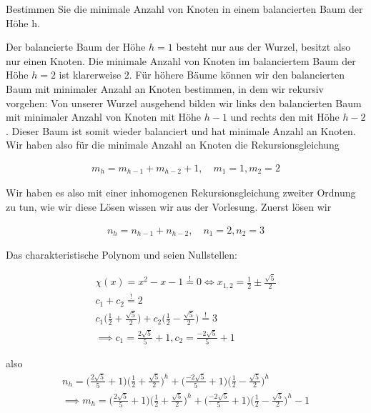 
\begin{exercise}

Bestimmen Sie die minimale Anzahl von Knoten in einem balancierten Baum der Höhe h.

\end{exercise}


\begin{solution}

Der balancierte Baum der Höhe $h = 1$ besteht nur aus der Wurzel, besitzt also nur einen Knoten. Die minimale Anzahl von Knoten im balanciertem Baum der Höhe $h = 2$ ist klarerweise $2$. Für höhere Bäume können wir den balancierten Baum mit minimaler Anzahl an Knoten bestimmen, in dem wir rekursiv vorgehen: Von unserer Wurzel ausgehend bilden wir links den balancierten Baum mit minimaler Anzahl von Knoten mit Höhe $h-1$ und rechts den mit Höhe $h-2$. Dieser Baum ist somit wieder balanciert und hat minimale Anzahl an Knoten. Wir haben also für die minimale Anzahl an Knoten die Rekursionsgleichung

\begin{align*}
  m_h = m_{h-1} + m_{h-2} + 1, \quad m_1 = 1, m_2 = 2
\end{align*}

Wir haben es also mit einer inhomogenen Rekursionsgleichung zweiter Ordnung zu tun, wie wir diese Lösen wissen wir aus der Vorlesung. Zuerst lösen wir

\begin{align*}
  n_h = n_{h-1} + n_{h-2}, \quad n_1 = 2, n_2 = 3
\end{align*}

Das charakteristische Polynom und seien Nullstellen:

\begin{align*}
  \chi(x) = x^2 - x - 1 \stackrel{!}{=} 0
  \iff
  x_{1,2} = \frac{1}{2} \pm \frac{\sqrt{5}}{2} \\
  c_1 + c_2 \stackrel{!}{=} 2 \\
  c_1\Big(\frac{1}{2} + \frac{\sqrt{5}}{2}\Big) + c_2 \Big(\frac{1}{2} - \frac{\sqrt{5}}{2}\Big) \stackrel{!}{=} 3 \\
  \implies c_1 = \frac{2\sqrt{5}}{5} + 1, c_2 = \frac{-2\sqrt{5}}{5} + 1
\end{align*}

also
\begin{align*}
  n_h = \Big(\frac{2\sqrt{5}}{5} + 1\Big)\Big(\frac{1}{2} + \frac{\sqrt{5}}{2}\Big)^h + \Big(\frac{-2\sqrt{5}}{5} + 1 \Big)\Big(\frac{1}{2} - \frac{\sqrt{5}}{2}\Big)^h \\
  \implies
  m_h = \Big(\frac{2\sqrt{5}}{5} + 1\Big)\Big(\frac{1}{2} + \frac{\sqrt{5}}{2}\Big)^h + \Big(\frac{-2\sqrt{5}}{5} + 1 \Big)\Big(\frac{1}{2} - \frac{\sqrt{5}}{2}\Big)^h - 1
\end{align*}
\end{solution}

